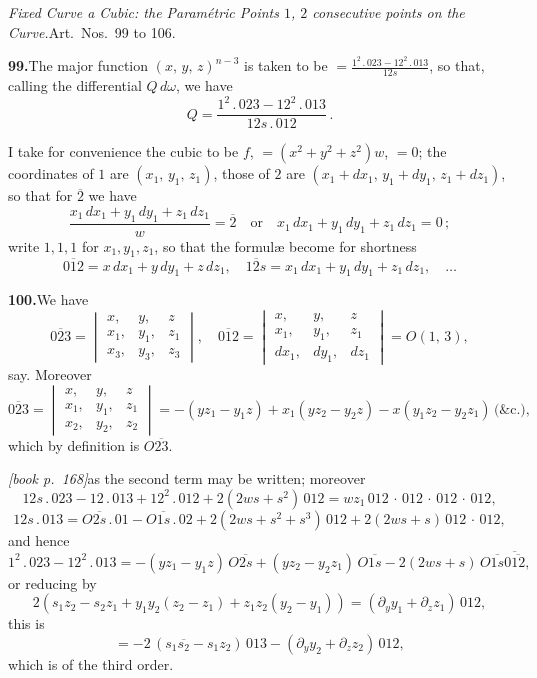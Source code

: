 \documentclass[11pt,a4paper]{article}
\begin{document}
\medskip\noindent\textit{Fixed Curve a Cubic: the Param\'etric Points $1$, $2$ consecutive points on the Curve.}\quad Art.\ Nos.\ 99 to 106.

\medskip\noindent\textbf{99.}\quad The major function $(x,\,y,\,z)^{n-3}$ is taken to be $= \frac{1^2\,.\,023 - 12^2\,.\,013}{12s}$, so that, calling the differential $Q\,d\omega$, we have
\[
Q = \frac{1^2\,.\,023 - 12^2\,.\,013}{12s\,.\,012}\,.
\]

I take for convenience the cubic to be $f$, $= (x^2 + y^2 + z^2)w$, $= 0$; the coordinates of $1$ are $(x_1,\,y_1,\,z_1)$, those of $2$ are $(x_1 + dx_1,\,y_1 + dy_1,\,z_1 + dz_1)$, so that for $\overline{2}$ we have
\[
\frac{x_1\,d x_1 + y_1\,d y_1 + z_1\,d z_1}{w} = \overline{2}\quad\text{or}\quad x_1\,d x_1 + y_1\,d y_1 + z_1\,d z_1 = 0\,;
\]
write $1, 1, 1$ for $x_1, y_1, z_1$, so that the formul\ae{} become for shortness
\[
\overline{012} = x\,dx_1 + y\,dy_1 + z\,dz_1,\quad \overline{12s} = x_1\,dx_1 + y_1\,dy_1 + z_1\,dz_1,\quad\ldots
\]

\medskip\noindent\textbf{100.}\quad We have
\[
\overline{023} = \begin{vmatrix} x, & y, & z\\ x_1, & y_1, & z_1\\ x_3, & y_3, & z_3 \end{vmatrix},\quad \overline{012} = \begin{vmatrix} x, & y, & z\\ x_1, & y_1, & z_1\\ dx_1, & dy_1, & dz_1 \end{vmatrix} = O(1,\,3),
\]
say. Moreover
\[
\overline{023} = \begin{vmatrix} x, & y, & z\\ x_1, & y_1, & z_1\\ x_2, & y_2, & z_2 \end{vmatrix} = -(yz_1 - y_1z) + x_1(yz_2 - y_2z) - x(y_1z_2 - y_2z_1)\,\text{(\&c.)},
\]
which by definition is $O\overline{23}$.

\medskip\noindent\textit{[book p.~168]}\quad as the second term may be written; moreover
\[
12s\,.\,023 - 12\,.\,013 + 12^2\,.\,012 + 2(2ws + s^2)\,012 = wz_1\,012\,\cdot\,012\,\cdot\,012\,\cdot\,012,
\]
\[
12s\,.\,013 = O\overline{2s}\,.\,01 - O\overline{1s}\,.\,02 + 2(2ws + s^2 + s^3)\,012 + 2(2ws + s)\,012\,\cdot\,012,
\]
and hence
\[
1^2\,.\,023 - 12^2\,.\,013 = -(yz_1 - y_1z)\,O\overline{2s} + (yz_2 - y_2z_1)\,O\overline{1s} - 2(2ws + s)\,O\overline{1s}\overline{0\overline{12}},
\]
or reducing by
\[
2(s_1z_2 - s_2z_1 + y_1y_2(z_2 - z_1) + z_1z_2(y_2 - y_1)) = (\partial_y y_1 + \partial_z z_1)\,012,
\]
this is
\[
= -2\,(s_1\overline{s_2} - s_1z_2)\,013 - (\partial_y y_2 + \partial_z z_2)\,012,
\]
which is of the third order.
\end{document}
